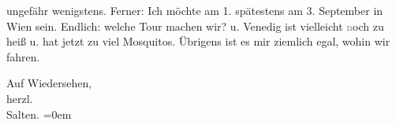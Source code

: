                ungefähr wenigstens. Ferner: Ich möchte am 1.
               spätestens am 3. September in Wien sein. Endlich: welche Tour machen wir? \label{K_L03312-3v}\label{K_L03312-3} u. Venedig ist vielleicht
                  \textcolor{gray}{n}och zu heiß u. hat jetzt zu viel Mosquitos. Übrigens ist es
               mir ziemlich egal, wohin wir fahren.\pend
           
\pstart
           Auf Wiedersehen, {\\[\baselineskip]}herzl. {\\[\baselineskip]}\spacefill\mbox{Salten.}\pend
           \leftskip=0em{}\endnumbering{}  \newcommand{\dateiname}{L03312}\newcommand{\titel}{Felix Salten an Arthur Schnitzler, [19. oder 20]. 8. 1900}\newcommand{\editorInnen}{Martin Anton Müller und Laura Untner}
